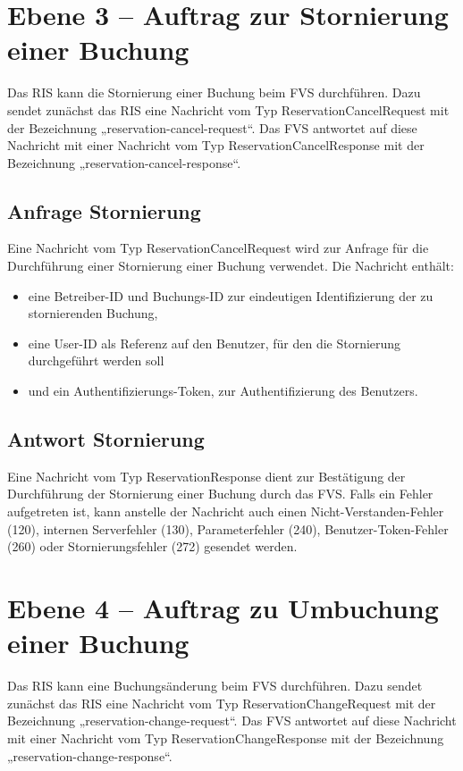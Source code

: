 


\section{Ebene 3 -- Auftrag zur Stornierung einer Buchung}
Das RIS kann die Stornierung einer Buchung beim FVS durchführen. Dazu sendet zunächst das RIS eine Nachricht vom Typ ReservationCancelRequest mit der Bezeichnung „reservation-cancel-request“. Das FVS antwortet auf diese Nachricht mit einer Nachricht vom Typ ReservationCancelResponse mit der Bezeichnung „reservation-cancel-response“.



\subsection{Anfrage Stornierung}
Eine Nachricht vom Typ ReservationCancelRequest wird zur Anfrage für die Durchführung einer Stornierung einer Buchung verwendet. Die Nachricht enthält:
\begin{itemize}
\item eine Betreiber-ID und Buchungs-ID zur eindeutigen Identifizierung der zu stornierenden Buchung,
\item eine User-ID als Referenz auf den Benutzer, für den die Stornierung durchgeführt werden soll
\item und ein Authentifizierungs-Token, zur Authentifizierung des Benutzers.
\end{itemize}



\subsection{Antwort Stornierung}
Eine Nachricht vom Typ ReservationResponse dient zur Bestätigung der Durchführung der Stornierung einer Buchung durch das FVS. Falls ein Fehler aufgetreten ist, kann anstelle der Nachricht auch einen Nicht-Verstanden-Fehler (120), internen Serverfehler (130), Parameterfehler (240), Benutzer-Token-Fehler (260) oder Stornierungsfehler (272) gesendet werden.




\section{Ebene 4 -- Auftrag zu Umbuchung einer Buchung}
Das RIS kann eine Buchungsänderung beim FVS durchführen. Dazu sendet zunächst das RIS eine Nachricht vom Typ ReservationChangeRequest mit der Bezeichnung „reservation-change-request“. Das FVS antwortet auf diese Nachricht mit einer Nachricht vom Typ ReservationChangeResponse mit der Bezeichnung „reservation-change-response“.

